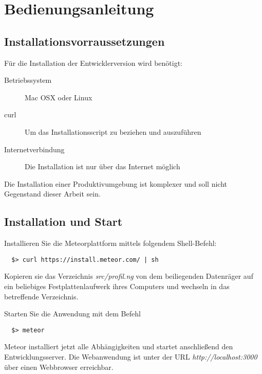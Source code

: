 
\chapter{Bedienungsanleitung} %

\label{ch:bedienungsanleitung} %


\section{Installationsvorraussetzungen}

Für die Installation der Entwicklerversion wird benötigt:

\begin{description}
  \item[Betriebssystem]{Mac OSX oder Linux}
  \item[curl]{Um das Installationsscript zu beziehen und auszuführen}
  \item[Internetverbindung]{Die Installation ist nur über das Internet möglich}
\end{description}

Die Installation einer Produktivumgebung ist komplexer und soll nicht Gegenstand
dieser Arbeit sein.

\section{Installation und Start}

Installieren Sie die Meteorplattform mittels folgendem Shell-Befehl:

\begin{verbatim}
  $> curl https://install.meteor.com/ | sh
\end{verbatim}

Kopieren sie das Verzeichnis \textit{src/profil.ng} von dem beiliegenden
Datenräger auf ein beliebiges Festplattenlaufwerk ihres Computers und wechseln
in das betreffende Verzeichnis.

Starten Sie die Anwendung mit dem Befehl

\begin{verbatim}
  $> meteor
\end{verbatim}

Meteor installiert jetzt alle Abhängigkeiten und startet anschließend den
Entwicklungsserver. Die Webanwendung ist unter der URL
\textit{http://localhost:3000} über einen Webbrowser erreichbar.

